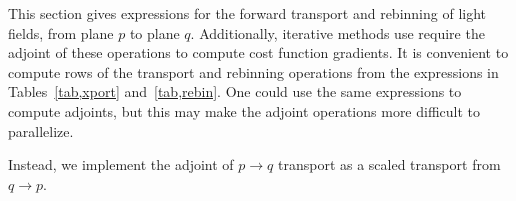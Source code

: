 This section gives expressions for the forward transport and rebinning of light
fields, \eg from plane $p$ to plane $q$.  Additionally, iterative methods use
require the adjoint of these operations to compute \eg{} cost function gradients.
It is convenient to compute rows of the transport and rebinning operations 
from the expressions in Tables~\ref{tab,xport} and~\ref{tab,rebin}.  One could
use the same expressions to compute adjoints, but this may make the adjoint
operations more difficult to parallelize.

Instead, we implement the adjoint of $p \rightarrow q$ transport as a scaled
transport from $q \rightarrow p$.

